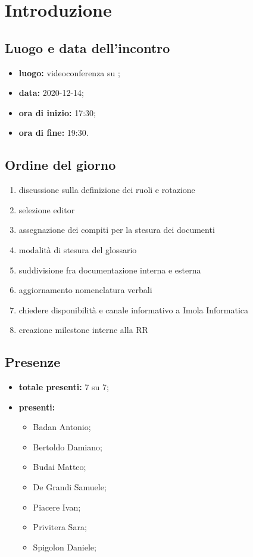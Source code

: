 \section*{Introduzione}

\subsection*{Luogo e data dell'incontro}
\begin{itemize}
	\item \textbf{luogo:} videoconferenza su ;
	\item \textbf{data:} 2020-12-14;
	\item \textbf{ora di inizio:} 17:30;
	\item \textbf{ora di fine:} 19:30.
\end{itemize}

\subsection*{Ordine del giorno}
	\begin{enumerate}
	\item discussione sulla definizione dei ruoli e rotazione
	\item selezione editor \glock{\LaTeX}
	\item assegnazione dei compiti per la stesura dei documenti
	\item modalità di stesura del glossario
	\item suddivisione fra documentazione interna e esterna
	\item aggiornamento nomenclatura verbali
	\item chiedere disponibilità e canale informativo a Imola Informatica
	\item creazione milestone interne alla RR
\end{enumerate}

\subsection*{Presenze}
\begin{itemize}
	\item \textbf{totale presenti:} 7 su 7;
	\item \textbf{presenti: }
	\begin{itemize}
		\item Badan Antonio;
		\item Bertoldo Damiano;
		\item Budai Matteo;
		\item De Grandi Samuele;
		\item Piacere Ivan;
		\item Privitera Sara;
		\item Spigolon Daniele;
	\end{itemize}
\end{itemize}


